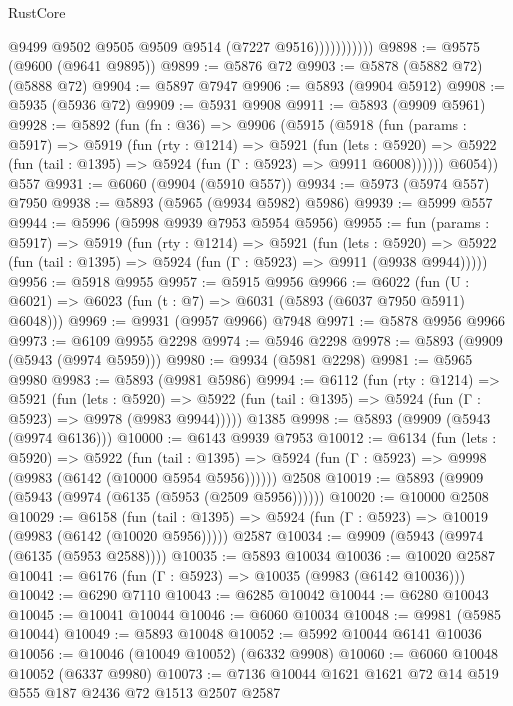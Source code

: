 \begin{lexlean}{RustCore}
\begin{coremodule}
                        @9499
                        @9502
                        @9505
                        @9509
                        @9514
                        (@7227 @9516)))))))))))
@9898 := @9575 (@9600 (@9641 @9895))
@9899 := @5876 @72
@9903 := @5878 (@5882 @72) (@5888 @72)
@9904 := @5897 @7947
@9906 := @5893 (@9904 @5912)
@9908 := @5935 (@5936 @72)
@9909 := @5931 @9908
@9911 := @5893 (@9909 @5961)
@9928 := @5892
    (fun (fn : @36) =>
    @9906
      (@5915
        (@5918
          (fun (params : @5917) =>
          @5919
            (fun (rty : @1214) =>
            @5921
              (fun (lets : @5920) =>
              @5922 (fun (tail : @1395) => @5924 (fun (Γ : @5923) => @9911 @6008))))))
        @6054))
    @557
@9931 := @6060 (@9904 (@5910 @557))
@9934 := @5973 (@5974 @557) @7950
@9938 := @5893 (@5965 (@9934 @5982) @5986)
@9939 := @5999 @557
@9944 := @5996 (@5998 @9939 @7953 @5954 @5956)
@9955 := fun (params : @5917) =>
  @5919
    (fun (rty : @1214) =>
    @5921
      (fun (lets : @5920) =>
      @5922 (fun (tail : @1395) => @5924 (fun (Γ : @5923) => @9911 (@9938 @9944)))))
@9956 := @5918 @9955
@9957 := @5915 @9956
@9966 := @6022 (fun (U : @6021) => @6023 (fun (t : @7) => @6031 (@5893 (@6037 @7950 @5911) @6048)))
@9969 := @9931 (@9957 @9966) @7948
@9971 := @5878 @9956 @9966
@9973 := @6109 @9955 @2298
@9974 := @5946 @2298
@9978 := @5893 (@9909 (@5943 (@9974 @5959)))
@9980 := @9934 (@5981 @2298)
@9981 := @5965 @9980
@9983 := @5893 (@9981 @5986)
@9994 := @6112
    (fun (rty : @1214) =>
    @5921
      (fun (lets : @5920) =>
      @5922 (fun (tail : @1395) => @5924 (fun (Γ : @5923) => @9978 (@9983 @9944)))))
    @1385
@9998 := @5893 (@9909 (@5943 (@9974 @6136)))
@10000 := @6143 @9939 @7953
@10012 := @6134
    (fun (lets : @5920) =>
    @5922
      (fun (tail : @1395) => @5924 (fun (Γ : @5923) => @9998 (@9983 (@6142 (@10000 @5954 @5956))))))
    @2508
@10019 := @5893 (@9909 (@5943 (@9974 (@6135 (@5953 (@2509 @5956))))))
@10020 := @10000 @2508
@10029 := @6158
    (fun (tail : @1395) => @5924 (fun (Γ : @5923) => @10019 (@9983 (@6142 (@10020 @5956)))))
    @2587
@10034 := @9909 (@5943 (@9974 (@6135 (@5953 @2588))))
@10035 := @5893 @10034
@10036 := @10020 @2587
@10041 := @6176 (fun (Γ : @5923) => @10035 (@9983 (@6142 @10036)))
@10042 := @6290 @7110
@10043 := @6285 @10042
@10044 := @6280 @10043
@10045 := @10041 @10044
@10046 := @6060 @10034
@10048 := @9981 (@5985 @10044)
@10049 := @5893 @10048
@10052 := @5992 @10044 @6141 @10036
@10056 := @10046 (@10049 @10052) (@6332 @9908)
@10060 := @6060 @10048 @10052 (@6337 @9980)
@10073 := @7136 @10044 @1621 @1621 @72 @14 @519 @555 @187 @2436 @72 @1513 @2507 @2587

\end{coremodule}
\end{lexlean}
